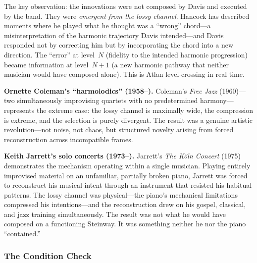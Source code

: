 \documentclass[12pt,letterpaper]{article}
\theoremstyle{definition}
\theoremstyle{remark}
\begin{document}
The key observation: the innovations were not composed by Davis and executed by the band. They were \emph{emergent from the lossy channel}. Hancock has described moments where he played what he thought was a ``wrong'' chord---a misinterpretation of the harmonic trajectory Davis intended---and Davis responded not by correcting him but by incorporating the chord into a new direction. The ``error'' at level~$N$ (fidelity to the intended harmonic progression) became information at level~$N{+}1$ (a new harmonic pathway that neither musician would have composed alone). This is Atlan level-crossing in real time.

\textbf{Ornette Coleman's ``harmolodics'' (1958--).} Coleman's \emph{Free Jazz} (1960)---two simultaneously improvising quartets with no predetermined harmony---represents the extreme case: the lossy channel is maximally wide, the compression is extreme, and the selection is purely divergent. The result was a genuine artistic revolution---not noise, not chaos, but structured novelty arising from forced reconstruction across incompatible frames.

\textbf{Keith Jarrett's solo concerts (1973--).} Jarrett's \emph{The K\"{o}ln Concert} (1975) demonstrates the mechanism operating within a single musician. Playing entirely improvised material on an unfamiliar, partially broken piano, Jarrett was forced to reconstruct his musical intent through an instrument that resisted his habitual patterns. The lossy channel was physical---the piano's mechanical limitations compressed his intentions---and the reconstruction drew on his gospel, classical, and jazz training simultaneously. The result was not what he would have composed on a functioning Steinway. It was something neither he nor the piano ``contained.''

\subsubsection{The Condition Check}
\end{document}
